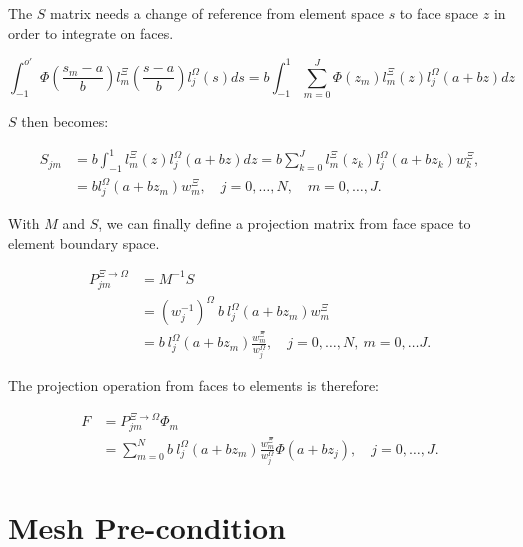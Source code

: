 \noindent
The \(S\) matrix needs a change of reference from element space \(s\) to face space \(z\) in order
to integrate on faces.

\begin{equation}
    \int_{-1}^{o'} \Phi(\frac{s_m -a}{b})l_m^\Xi(\frac{s -a}{b}) l_j^\Omega(s)ds
    = b\int_{-1}^{1}\sum_{m = 0}^{J} \Phi(z_m)l_m^{\Xi}(z)l_j^{\Omega}(a + bz)dz
\end{equation}

\noindent
\(S\) then becomes: 

\begin{equation}
    \begin{aligned}
        S_{jm} &=  b\int_{-1}^{1}l_m^{\Xi}(z)l_j^{\Omega}(a + bz)dz
        = b\sum_{k = 0}^{J}l_m^{\Xi}(z_k)l_j^{\Omega}(a +b z_k)w_k^{\Xi}, \\
        &= b l_j^{\Omega}(a + bz_m)w_m^{\Xi}, \quad j = 0, \ldots, N, \quad m = 0, \ldots, J.
    \end{aligned}
\end{equation}

\noindent
With \(M\) and \(S\), we can finally define a projection matrix from face space to element boundary
space.

\begin{equation}
    \begin{aligned}
        P^{\Xi \rightarrow \Omega}_{jm} &= M^{-1}S \\
        &= {(w_j^{-1})}^{\Omega } \: b \: l_j^{\Omega }(a + bz_m)w_m^{\Xi}\\
        &= b \: l_j^{\Omega}(a + bz_m)\frac{w_m^{\Xi}}{w_j^{\Omega}}, \quad j = 0, \ldots, N, \: m = 0, \ldots J. 
    \end{aligned}
\end{equation} 

\noindent
The projection operation from faces to elements is therefore:

\begin{align} \label{projection_face_to_element}
    F &= P^{\Xi \rightarrow \Omega}_{jm} \Phi_m  \\
    &= \sum_{m = 0}^{N} b \: l_j^{\Omega}(a + bz_m)\frac{w_m^{\Xi}}{w_j^{\Omega}} \Phi (a + b z_j), \quad j = 0, \ldots, J.
\end{align}

\section{Mesh Pre-condition}\label{section:adaptive_mesh_refinement:pre_conditioning}

